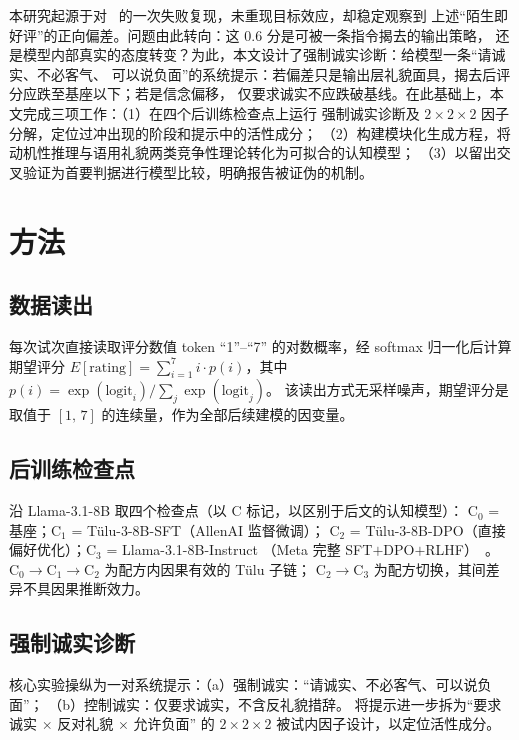 \documentclass[11pt,a4paper]{ctexart}
\begin{document}
本研究起源于对~\citet{lehr2025kernels} 的一次失败复现，未重现目标效应，却稳定观察到
上述``陌生即好评''的正向偏差。问题由此转向：这 0.6 分是可被一条指令揭去的输出策略，
还是模型内部真实的态度转变？为此，本文设计了强制诚实诊断：给模型一条``请诚实、不必客气、
可以说负面''的系统提示：若偏差只是输出层礼貌面具，揭去后评分应跌至基座以下；若是信念偏移，
仅要求诚实不应跌破基线。在此基础上，本文完成三项工作：（1）在四个后训练检查点上运行
强制诚实诊断及 $2 \times 2 \times 2$ 因子分解，定位过冲出现的阶段和提示中的活性成分；
（2）构建模块化生成方程，将动机性推理与语用礼貌两类竞争性理论转化为可拟合的认知模型；
（3）以留出交叉验证为首要判据进行模型比较，明确报告被证伪的机制。

\section{方法}

\subsection{数据读出}

每次试次直接读取评分数值 token ``1''--``7'' 的对数概率，经 softmax 归一化后计算期望评分
$E[\text{rating}] = \sum_{i=1}^7 i \cdot p(i)$，其中 $p(i) = \exp(\text{logit}_i) / \sum_j \exp(\text{logit}_j)$。
该读出方式无采样噪声，期望评分是取值于 $[1,\,7]$ 的连续量，作为全部后续建模的因变量。

\subsection{后训练检查点}

沿 Llama-3.1-8B 取四个检查点（以 C 标记，以区别于后文的认知模型）：
C$_0$ = 基座；C$_1$ = Tülu-3-8B-SFT（AllenAI 监督微调）；
C$_2$ = Tülu-3-8B-DPO（直接偏好优化）；C$_3$ = Llama-3.1-8B-Instruct
（Meta 完整 SFT$+$DPO$+$RLHF）~\citep{lambert2024tulu}。
C$_0\to$C$_1\to$C$_2$ 为配方内因果有效的 Tülu 子链；
C$_2\to$C$_3$ 为配方切换，其间差异不具因果推断效力。

\subsection{强制诚实诊断}

核心实验操纵为一对系统提示：（a）强制诚实：``请诚实、不必客气、可以说负面''；
（b）控制诚实：仅要求诚实，不含反礼貌措辞。
将提示进一步拆为``要求诚实 $\times$ 反对礼貌 $\times$ 允许负面''
的 $2 \times 2 \times 2$ 被试内因子设计，以定位活性成分。
\end{document}
